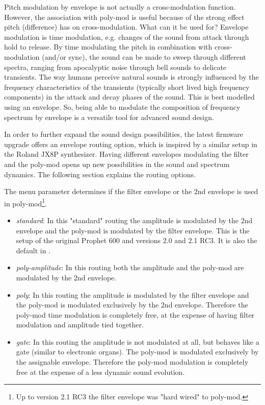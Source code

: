 Pitch modulation by envelope is not actually a cross-modulation function. However, the association with poly-mod is useful because of the strong effect pitch (difference) has on cross-modulation. What can it be used for? Envelope modulation is time modulation, e.g. changes of the sound from attack through hold to release. By time modulating the pitch in combination with cross-modulation (and/or sync), the sound can be made to sweep through different spectra, ranging from apocalyptic noise through bell sounds to delicate transients. The way humans perceive natural sounds is strongly influenced by the frequency characteristics of the transients (typically short lived high frequency components) in the attack and decay phases of the sound. This is best modelled using an envelope. So, being able to modulate the composition of frequency spectrum by envelope is a versatile tool for advanced sound design. 

In order to further expand the sound design possibilities, the latest firmware upgrade offers an envelope routing option, which is inspired by a similar setup in the Roland JX8P synthesizer. Having different envelopes modulating the filter and the poly-mod opens up new possibilities in the sound and spectrum dynamics. The following section explains the routing options. 

The menu parameter \envrouting determines if the filter envelope or the 2nd envelope is used in poly-mod\footnote{Up to version 2.1 RC3 the filter envelope was "hard wired" to poly-mod.}.

\begin{itemize}
  \setlength\itemsep{0cm}
  \item \textit{standard}: In this "standard" routing the amplitude is modulated by the 2nd envelope and the poly-mod is modulated by the filter envelope. This is the setup of the original Prophet 600 and versions 2.0 and 2.1 RC3. It is also the default in \version.
  \item \textit{poly-amplitude}: In this routing both the amplitude and the poly-mod are modulated by the 2nd envelope. 
  \item \textit{poly}: In this routing the amplitude is modulated by the filter envelope and the poly-mod is modulated exclusively by the 2nd envelope. Therefore the poly-mod time modulation is completely free, at the expense of having filter modulation and amplitude tied together.
  \item \textit{gate}: In this routing the amplitude is not modulated at all, but behaves like a gate (similar to electronic organs). The poly-mod is modulated exclusively by the assignable envelope. Therefore the poly-mod modulation is completely free at the expense of a less dynamic sound evolution.
\end{itemize}  

